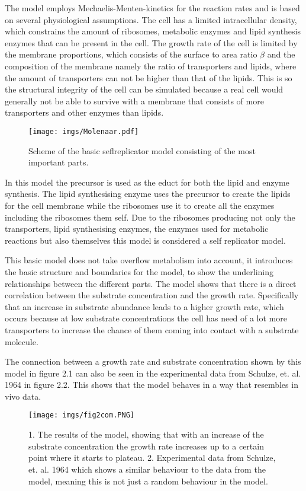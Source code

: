 The model employs Mechaelis-Menten-kinetics for the reaction rates and is based on several physiological assumptions. The cell has a limited intracellular density, which constrains the amount of ribosomes, metabolic enzymes and lipid synthesis enzymes that can be present in the cell. The growth rate of the cell is limited by the membrane proportions, which consists of the surface to area ratio $\beta$ and the composition of the membrane namely the ratio of transporters and lipids, where the amount of transporters can not be higher than that of the lipids. This is so the structural integrity of the cell can be simulated because a real cell would generally not be able to survive with a membrane that consists of more transporters and other enzymes than lipids. 

\begin{figure}[H]
    \centering
    \texttt{[image: imgs/Molenaar.pdf]}
    \caption{Scheme of the basic seflreplicator model consisting of the most important parts.}
    \label{fig:Molenaar}
\end{figure}

In this model the precursor is used as the educt for both the lipid and enzyme synthesis. The lipid synthesising enzyme uses the precursor to create the lipids for the cell membrane while the ribosomes use it to create all the enzymes including the ribosomes them self. Due to the ribosomes producing not only the transporters, lipid synthesising enzymes, the enzymes used for metabolic reactions but also themselves this model is considered a self replicator model. 

This basic model does not take overflow metabolism into account, it introduces the basic structure and boundaries for the model, to show the underlining relationships between the different parts. The model shows that there is a direct correlation between the substrate concentration and the growth rate. Specifically that an increase in substrate abundance leads to a higher growth rate, which occurs because at low substrate concentrations the cell has need of a lot more transporters to increase the chance of them coming into contact with a substrate molecule. 

The connection between a growth rate and substrate concentration shown by this model in figure 2.1 can also be seen in the experimental data from Schulze, et. al. 1964 \cite{schulze1964relationship} in figure 2.2. This shows that the model behaves in a way that resembles in vivo data.

\begin{figure}[H]
    \centering
    \texttt{[image: imgs/fig2com.PNG]}
    \caption{1. The results of the model, showing that with an increase of the substrate concentration the growth rate increases up to a certain point where it starts to plateau. 2. Experimental data from Schulze, et. al. 1964 \cite{schulze1964relationship} which shows a similar behaviour to the data from the model, meaning this is not just a random behaviour in the model.}
    \label{fig:fig2com}
\end{figure}

